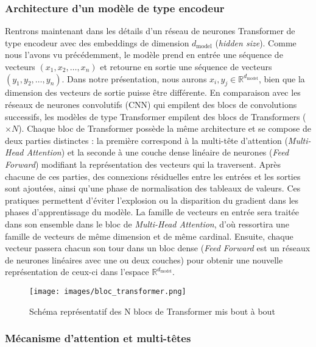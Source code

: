 \documentclass[12pt]{article}
\theoremstyle{definition}
\begin{document}
\subsubsection{Architecture d'un modèle de type encodeur}
Rentrons maintenant dans les détails d'un réseau de neurones Transformer de type encodeur avec des embeddings de dimension \(d_{\text{model}}\) (\textit{hidden size}). Comme nous l'avons vu précédemment, le modèle prend en entrée une séquence de vecteurs \((x_1, x_2, \dots, x_n)\) et retourne en sortie une séquence de vecteurs \((y_1, y_2, \dots, y_n)\). Dans notre présentation, nous aurons \(x_i, y_j \in \mathbb{R}^{d_{\text{model}}}\), bien que la dimension des vecteurs de sortie puisse être différente. En comparaison avec les réseaux de neurones convolutifs (CNN) qui empilent des blocs de convolutions successifs, les modèles de type Transformer empilent des blocs de Transformers (\(\times N\)). Chaque bloc de Transformer possède la même architecture et se compose de deux parties distinctes : la première correspond à la multi-tête d'attention (\textit{Multi-Head Attention}) et la seconde à une couche dense linéaire de neurones (\textit{Feed Forward}) modifiant la représentation des vecteurs qui la traversent. Après chacune de ces parties, des connexions résiduelles entre les entrées et les sorties sont ajoutées, ainsi qu'une phase de normalisation des tableaux de valeurs. Ces pratiques permettent d'éviter l'explosion ou la disparition du gradient dans les phases d'apprentissage du modèle. La famille de vecteurs en entrée sera traitée dans son ensemble dans le bloc de \textit{Multi-Head Attention}, d'où ressortira une famille de vecteurs de même dimension et de même cardinal. Ensuite, chaque vecteur passera chacun son tour dans un bloc dense (\textit{Feed Forward} est un réseaux de neurones linéaires avec une ou deux couches) pour obtenir une nouvelle représentation de ceux-ci dans l'espace \(\mathbb{R}^{d_{\text{model}}}\).

\begin{figure*}[!h]
	\centering
	\texttt{[image: images/bloc\_transformer.png]}
	\caption{Schéma représentatif des N blocs de Transformer mis bout à bout}
\end{figure*}



\subsubsection{Mécanisme d'attention et multi-têtes}
\end{document}
